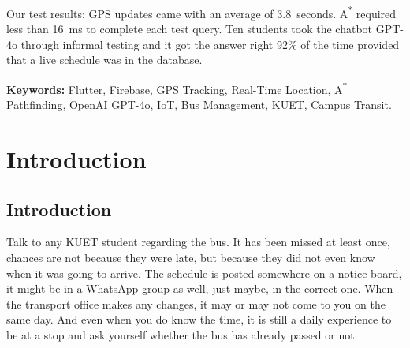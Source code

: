\documentclass[12pt,a4paper]{report}
\begin{document}
Our test results: GPS updates came with an average of 3.8~seconds. A\textsuperscript{*} required less than 16~ms to complete each test query. Ten students took the chatbot GPT-4o through informal testing and it got the answer right 92\% of the time provided that a live schedule was in the database.

\vspace{12pt}
\noindent\textbf{Keywords:} Flutter, Firebase, GPS Tracking, Real-Time Location, A\textsuperscript{*} Pathfinding, OpenAI GPT-4o, IoT, Bus Management, KUET, Campus Transit.

\newpage

{}
\tableofcontents
\newpage

{}
\listoftables
\newpage

{}
\listoffigures
\newpage

\setcounter{page}{1}

\chapter{Introduction}

\section{Introduction}

Talk to any KUET student regarding the bus. It has been missed at least once, chances are not because they were late, but because they did not even know when it was going to arrive. The schedule is posted somewhere on a notice board, it might be in a WhatsApp group as well, just maybe, in the correct one. When the transport office makes any changes, it may or may not come to you on the same day. And even when you do know the time, it is still a daily experience to be at a stop and ask yourself whether the bus has already passed or not.
\end{document}
